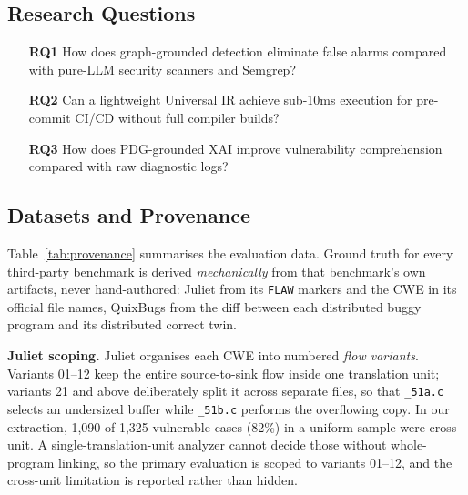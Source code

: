 \documentclass[10pt,conference]{IEEEtran}
\begin{document}
\subsection{Research Questions}
\begin{itemize}
\item[\textbf{RQ1}] How does graph-grounded detection eliminate false alarms
compared with pure-LLM security scanners and Semgrep?
\item[\textbf{RQ2}] Can a lightweight Universal IR achieve sub-10ms execution
for pre-commit CI/CD without full compiler builds?
\item[\textbf{RQ3}] How does PDG-grounded XAI improve vulnerability
comprehension compared with raw diagnostic logs?
\end{itemize}

\subsection{Datasets and Provenance}
Table~\ref{tab:provenance} summarises the evaluation data. Ground truth for
every third-party benchmark is derived \emph{mechanically} from that
benchmark's own artifacts, never hand-authored: Juliet from its
\texttt{FLAW} markers and the CWE in its official file names, QuixBugs from
the diff between each distributed buggy program and its distributed correct
twin.

\begin{table}[t]
\centering
\caption{Dataset provenance. Primary benchmarks are third-party and
unmodified; the secondary benchmark is generated by us and released with its
generator.}
\label{tab:provenance}
\footnotesize
{}
\end{table}

\textbf{Juliet scoping.} Juliet organises each CWE into numbered
\emph{flow variants}. Variants 01--12 keep the entire source-to-sink flow
inside one translation unit; variants 21 and above deliberately split it
across separate files, so that \texttt{\_51a.c} selects an undersized buffer
while \texttt{\_51b.c} performs the overflowing copy. In our extraction,
1{,}090 of 1{,}325 vulnerable cases (82\%) in a uniform sample were
cross-unit. A single-translation-unit analyzer cannot decide those without
whole-program linking, so the primary evaluation is scoped to variants
01--12, and the cross-unit limitation is reported rather than hidden.
\end{document}
